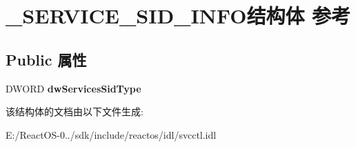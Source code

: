 \hypertarget{struct___s_e_r_v_i_c_e___s_i_d___i_n_f_o}{}\section{\+\_\+\+S\+E\+R\+V\+I\+C\+E\+\_\+\+S\+I\+D\+\_\+\+I\+N\+F\+O结构体 参考}
\label{struct___s_e_r_v_i_c_e___s_i_d___i_n_f_o}
\subsection*{Public 属性}
\begin{DoxyCompactItemize}
\item 
\mbox{\label{struct___s_e_r_v_i_c_e___s_i_d___i_n_f_o_acca89322da4a662ceb3216755e070eec}} 
D\+W\+O\+RD {\bfseries dw\+Services\+Sid\+Type}
\end{DoxyCompactItemize}


该结构体的文档由以下文件生成\+:\begin{DoxyCompactItemize}
\item 
E\+:/\+React\+O\+S-\/0../sdk/include/reactos/idl/svcctl.\+idl\end{DoxyCompactItemize}

